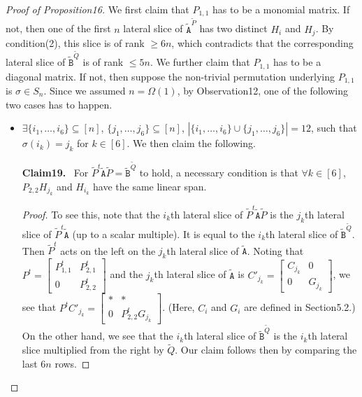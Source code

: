\documentclass[10pt,a4paper]{article}
\newenvironment{authorclaim}[1]{\par\medskip\noindent\textbf{#1.}\ }{\par\medskip}
\begin{document}
\begin{proof}[Proof of Proposition16]
We first claim that $P_{1,1}$ has to be a monomial matrix. If not, then one of the first $n$ lateral slice of $\widetilde{\mathtt A}^{\widetilde P}$ has two distinct $H_i$ and $H_j$. By condition(2), this slice is of rank $\ge6n$, which contradicts that the corresponding lateral slice of $\widetilde{\mathtt B}^{\widetilde Q}$ is of rank $\le5n$.
We further claim that $P_{1,1}$ has to be a diagonal matrix. If not, then suppose the non-trivial permutation underlying $P_{1,1}$ is $\sigma\in S_n$. Since we assumed $n=\Omega(1)$, by Observation12, one of the following two cases has to happen.
\begin{itemize}
\item $\exists\{i_1,\ldots,i_6\}\subseteq[n]$, $\{j_1,\ldots,j_6\}\subseteq[n]$, $|\{i_1,\ldots,i_6\}\cup\{j_1,\ldots,j_6\}|=12$, such that $\sigma(i_k)=j_k$ for $k\in[6]$. We then claim the following.
\begin{authorclaim}{Claim19}
For $\widetilde P^t\widetilde{\mathtt A}\widetilde P=\widetilde{\mathtt B}^{\widetilde Q}$ to hold, a necessary condition is that $\forall k\in[6]$, $P_{2,2}H_{j_k}$ and $H_{i_k}$ have the same linear span.
\end{authorclaim}
\begin{proof}
To see this, note that the $i_k$th lateral slice of $\widetilde P^t\widetilde{\mathtt A}\widetilde P$ is the $j_k$th lateral slice of $\widetilde P^t\widetilde{\mathtt A}$ (up to a scalar multiple). It is equal to the $i_k$th lateral slice of $\widetilde{\mathtt B}^{\widetilde Q}$. Then $\widetilde P^t$ acts on the left on the $j_k$th lateral slice of $\widetilde{\mathtt A}$. Noting that $P^t=\begin{bmatrix}P_{1,1}^t&P_{2,1}^t\\0&P_{2,2}^t\end{bmatrix}$ and the $j_k$th lateral slice of $\widetilde{\mathtt A}$ is $C'_{j_k}=\begin{bmatrix}C_{j_k}&0\\0&G_{j_k}\end{bmatrix}$, we see that $P^tC'_{j_k}=\begin{bmatrix}*&*\\0&P_{2,2}^tG_{j_k}\end{bmatrix}$. (Here, $C_i$ and $G_i$ are defined in Section5.2.) On the other hand, we see that the $i_k$th lateral slice of $\widetilde{\mathtt B}^{\widetilde Q}$ is the $i_k$th lateral slice multiplied from the right by $\widetilde Q$. Our claim follows then by comparing the last $6n$ rows.
\end{proof}

\end{itemize}
\end{proof}
\end{document}
